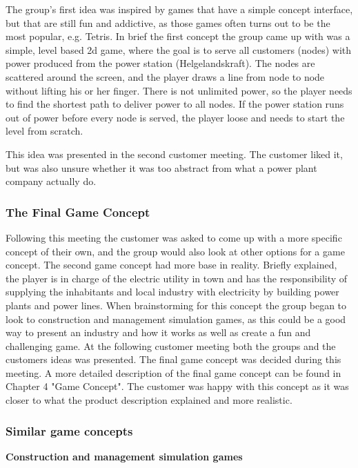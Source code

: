 The group's first idea was inspired by games that have a simple concept interface, but that are still fun and addictive, as those games often turns out to be the most popular, e.g. Tetris. In brief the first concept the group came up with was a simple, level based 2d game, where the goal is to serve all customers (nodes) with power produced from the power station
(Helgelandskraft). The nodes are scattered around the screen, and the player draws a line from node to node without lifting his or her finger. There is not unlimited power, so the player needs to find the shortest path to deliver
power to all nodes. If the power station runs out of power before every node is served, the player loose and needs to start the level from scratch.

This idea was presented in the second customer meeting. The customer liked it, but was also unsure whether it was too abstract from what a power plant company actually do. 

\subsubsection{The Final Game Concept}

Following this meeting the customer was asked to come up with a more specific concept of their own, and the group would also look at other options for a game concept. The second game concept had more base in reality. Briefly explained, the player is in charge of the electric utility in town and has the responsibility of supplying the inhabitants and local industry with electricity by building power plants and power lines. When brainstorming for this concept the group began to look to construction and management simulation games, as this could be a good way to present an industry and how it works as well as create a fun and challenging game. At the following customer meeting both the groups and the customers ideas was presented. The final game concept was decided during this meeting. A more detailed description of the final game concept can be found in Chapter 4 "Game Concept". The customer was happy with this concept as it was closer to what the product description explained and more realistic.

\subsubsection{Similar game concepts}

{\bf Construction and management simulation games}


